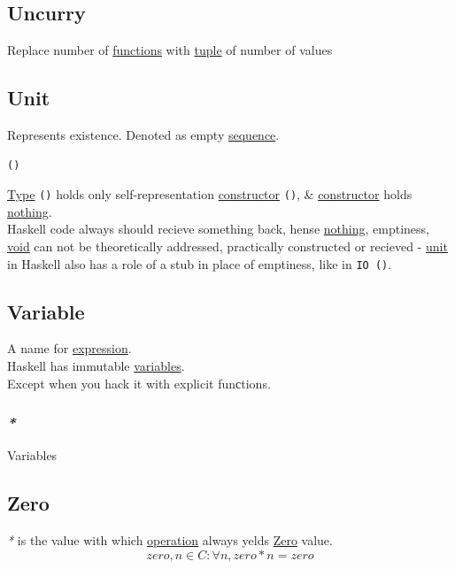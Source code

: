 \documentclass[11pt]{article}
\begin{document}
\subsection{\label{org9bed5ae}Uncurry}
\label{sec:org9dd4950}
Replace number of \hyperref[org66c5288]{functions} with \hyperref[org7c37a79]{tuple} of number of values\\

\subsection{\label{org2833f3f}Unit}
\label{sec:orgc0e5543}
Represents existence. Denoted as empty \hyperref[orgf90a45c]{sequence}.\\
\begin{verbatim}
()
\end{verbatim}

\hyperref[org4fbaeb8]{Type} \texttt{()} holds only self-representation \hyperref[orgd019743]{constructor} \texttt{()}, \& \hyperref[orgd019743]{constructor} holds \hyperref[org235dcde]{nothing}.\\

Haskell code always should recieve something back, hense \hyperref[org235dcde]{nothing}, emptiness, \hyperref[org94d6fd1]{void} can not be theoretically addressed, practically constructed or recieved - \hyperref[org2833f3f]{unit} in Haskell also has a role of a stub in place of emptiness, like in \texttt{IO ()}.\\

\subsection{\label{org301bab5}Variable}
\label{sec:org630bc5f}
A name for \hyperref[org667db83]{expression}.\\

Haskell has immutable \hyperref[orgd3f3ade]{variables}.\\
Except when you hack it with explicit funсtions.\\

\subsubsection{\emph{*}}
\label{sec:orgb45a3ac}

\label{orgd3f3ade}Variables\\

\subsection{\label{orgf8da8e8}Zero}
\label{sec:orgf15f8e3}
\emph{*} is the value with which \hyperref[org87d485b]{operation} always yelds \hyperref[orgf8da8e8]{Zero} value.\\
$$ zero, n \in C : \forall n, zero*n=zero $$\\
\end{document}

